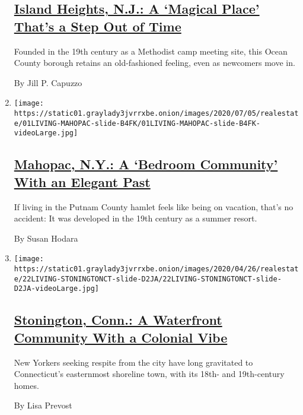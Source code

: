 \begin{enumerate}
  \hypertarget{island-heights-nj-a-magical-place-thats-a-step-out-of-time}{%
  \subsection{\texorpdfstring{\href{/2020/07/08/realestate/island-heights-nj-a-magical-place-thats-a-step-out-of-time.html}{Island
  Heights, N.J.: A `Magical Place' That's a Step Out of
  Time}}{Island Heights, N.J.: A `Magical Place' That's a Step Out of Time}}\label{island-heights-nj-a-magical-place-thats-a-step-out-of-time}}

  Founded in the 19th century as a Methodist camp meeting site, this
  Ocean County borough retains an old-fashioned feeling, even as
  newcomers move in.

  By Jill P. Capuzzo
\item
  \texttt{[image: https://static01.graylady3jvrrxbe.onion/images/2020/07/05/realestate/01LIVING-MAHOPAC-slide-B4FK/01LIVING-MAHOPAC-slide-B4FK-videoLarge.jpg]}

  \hypertarget{mahopac-ny-a-bedroom-community-with-an-elegant-past}{%
  \subsection{\texorpdfstring{\href{/2020/07/01/realestate/mahopac-ny-a-bedroom-community-with-an-elegant-past.html}{Mahopac,
  N.Y.: A `Bedroom Community' With an Elegant
  Past}}{Mahopac, N.Y.: A `Bedroom Community' With an Elegant Past}}\label{mahopac-ny-a-bedroom-community-with-an-elegant-past}}

  If living in the Putnam County hamlet feels like being on vacation,
  that's no accident: It was developed in the 19th century as a summer
  resort.

  By Susan Hodara
\item
  \texttt{[image: https://static01.graylady3jvrrxbe.onion/images/2020/04/26/realestate/22LIVING-STONINGTONCT-slide-D2JA/22LIVING-STONINGTONCT-slide-D2JA-videoLarge.jpg]}

  \hypertarget{stonington-conn-a-waterfront-community-with-a-colonial-vibe}{%
  \subsection{\texorpdfstring{\href{/2020/04/22/realestate/stonington-conn-a-waterfront-community-with-a-colonial-vibe.html}{Stonington,
  Conn.: A Waterfront Community With a Colonial
  Vibe}}{Stonington, Conn.: A Waterfront Community With a Colonial Vibe}}\label{stonington-conn-a-waterfront-community-with-a-colonial-vibe}}

  New Yorkers seeking respite from the city have long gravitated to
  Connecticut's easternmost shoreline town, with its 18th- and
  19th-century homes.

  By Lisa Prevost
\end{enumerate}

